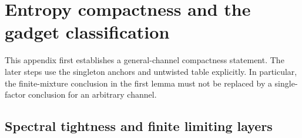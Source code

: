 \section{Entropy compactness and the gadget classification}\label{app:compactness}

This appendix first establishes a general-channel compactness statement. The later steps use the singleton
anchors and untwisted table explicitly. In particular, the finite-mixture conclusion in the first lemma must
not be replaced by a single-factor conclusion for an arbitrary channel.

\subsection{Spectral tightness and finite limiting layers}

